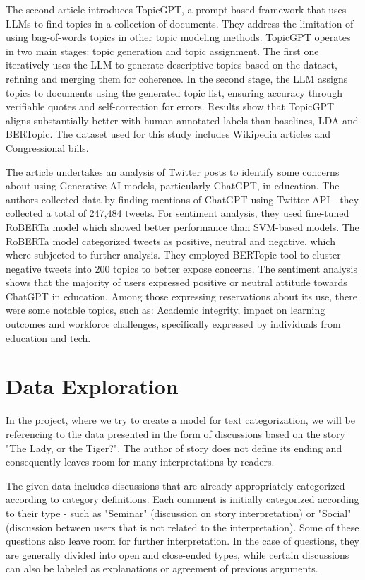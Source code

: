 \documentclass[fleqn,moreauthors,10pt]{ds_report}
\begin{document}
The second article \cite{pham2023topicgpt} introduces TopicGPT, a prompt-based framework that uses LLMs to find topics in a collection of documents. They address the limitation of using bag-of-words topics in other topic modeling methods. TopicGPT operates in two main stages: topic generation and topic assignment. The first one iteratively uses the LLM to generate descriptive topics based on the dataset, refining and merging them for coherence. In the second stage, the LLM assigns topics to documents using the generated topic list, ensuring accuracy through verifiable quotes and self-correction for errors. Results show that TopicGPT aligns substantially better with human-annotated labels than baselines, LDA and BERTopic. The dataset used for this study includes Wikipedia articles and Congressional bills.

The article \cite{Li_Ma_Fan_Lee_Yu_Hemphill_2023} undertakes an analysis of Twitter posts to identify some concerns about using Generative AI models, particularly  ChatGPT, in education. The authors collected data by finding mentions of ChatGPT using Twitter API - they collected a total of 247,484 tweets. For sentiment analysis, they used fine-tuned RoBERTa model which showed better performance than SVM-based models. The RoBERTa model categorized tweets as positive, neutral and negative, which where subjected to further analysis. They employed BERTopic tool to cluster negative tweets into 200 topics to better expose concerns. The sentiment analysis shows that the majority of users expressed positive or neutral attitude towards ChatGPT in education. Among those expressing reservations about its use, there were some notable topics, such as: Academic integrity, impact on learning outcomes and workforce challenges, specifically expressed by individuals from education and tech. 




\section*{Data Exploration}

In the project, where we try to create a model for text categorization, we will be referencing to the data presented in the form of discussions based on the story "The Lady, or the Tiger?". The author of story does not define its ending and consequently leaves room for many interpretations by readers.

The given data includes discussions that are already appropriately categorized according to category definitions. Each comment is initially categorized according to their type - such as "Seminar" (discussion on story interpretation) or "Social" (discussion between users that is not related to the interpretation). Some of these questions also leave room for further interpretation. In the case of questions, they are generally divided into open and close-ended types, while certain discussions can also be labeled as explanations or agreement of previous arguments.
\end{document}
